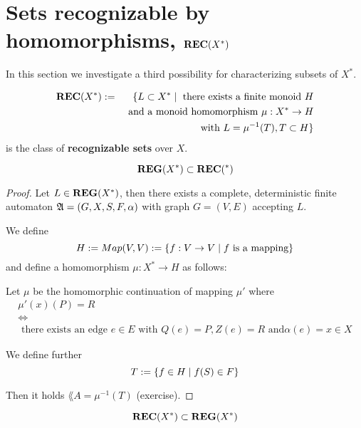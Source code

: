 \section{Sets recognizable by homomorphisms,
\texorpdfstring{$\mbox{{\bf REC}}(X^*)$}{REC(X*)}}

In this section we investigate a third possibility for characterizing subsets of
$X^*$.

\begin{definition}
\begin{eqnarray*}
 \mbox{{\bf REC}}(X^*) & := & \{ L \subset X^* \mid \mbox{ there exists a
finite monoid } H \\
& & \mbox{ and a monoid homomorphism }\mu : X^* \to H \\
& & \mbox{ with } L = \mu^{-1}(T), T \subset H \}
\end{eqnarray*}
is the class of {\bf recognizable sets} over $X$.
\end{definition}

\begin{lemma}
\[ \mbox{{\bf REG}}(X^*) \subset \mbox{{\bf REC}}(^*) \]
\end{lemma}

\begin{proof}
Let $L \in \mbox{{\bf REG}}(X^*)$, then there exists a complete, deterministic finite
automaton $\mbox{$\mathfrak{A}$} = (G, X, S, F, \alpha)$ with graph $G = (V, E)$ accepting $L$.

We define 
\[ H := Map(V,V) := \mbox{$\{f : V \to V \mid f \mbox{ is a mapping}\}$} \]
and define a homomorphism $\mu : X^* \to H$ as follows:

Let $\mu$ be the homomorphic continuation of mapping $\mu'$ where
\begin{eqnarray*}
& \mu'(x)(P) = R & \\
& \Leftrightarrow & \\
& \mbox{ there exists an edge }e \in E\mbox{ with }Q(e) = P, Z(e) = R\mbox{ and
}\alpha(e) = x \in X &
\end{eqnarray*}

We define further \[ T := \mbox{$\{f \in H \mid f(S) \in F\}$} \]

Then it holds $\lang{A} = \mu^{-1}(T)$ (exercise).
\end{proof}

\bigskip
\begin{lemma}
\[ \mbox{{\bf REC}}(X^*) \subset \mbox{{\bf REG}}(X^*) \]
\end{lemma}

